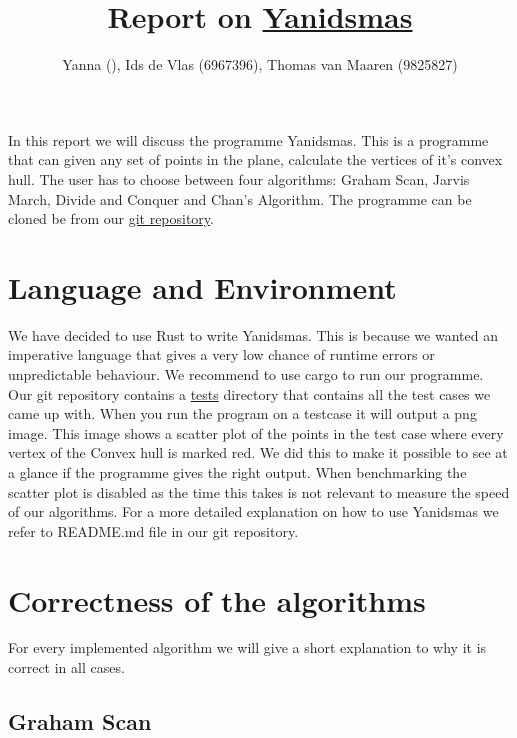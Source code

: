 \documentclass{article}
\title{Report on \href{https://github.com/tvmaaren/GeoAlgBonus-Yanidsmas}{Yanidsmas}}
\author{Yanna \todo{surname} (\todo{student number}), Ids de Vlas (6967396), Thomas van Maaren (9825827)}
\begin{document}
\maketitle

In this report we will discuss the programme Yanidsmas. This is a programme that can
given any set of points in the plane, calculate the vertices of it's convex hull. The
user has to choose between four algorithms: Graham Scan, Jarvis March, Divide
and Conquer and Chan's Algorithm. The programme can be cloned be from our
\href{https://github.com/tvmaaren/GeoAlgBonus-Yanidsmas}{git repository}.

\section*{Language and Environment}

We have decided to use Rust to write Yanidsmas. This is because we wanted an imperative
language that gives a very low chance of runtime errors or unpredictable behaviour.
We recommend to use cargo to run our programme.
Our git repository contains a \href{https://github.com/tvmaaren/GeoAlgBonus-Yanidsmas/tree/main/tests}{tests} directory that contains all the test cases we came up with.
When you run the program on a testcase it will output a png image. This image shows
a scatter plot of the points in the test case where every vertex of the Convex hull is
marked red. We did this to make it possible to see at a glance if the programme gives
the right output. When benchmarking the scatter plot is disabled as the
time this takes is not relevant to measure the speed of our algorithms. For a more
detailed explanation on how to use Yanidsmas we refer to README.md file in our git repository.

\section*{Correctness of the algorithms}

For every implemented algorithm we will give a short explanation to why it is correct in
all cases.

\subsection*{Graham Scan}
\end{document}

